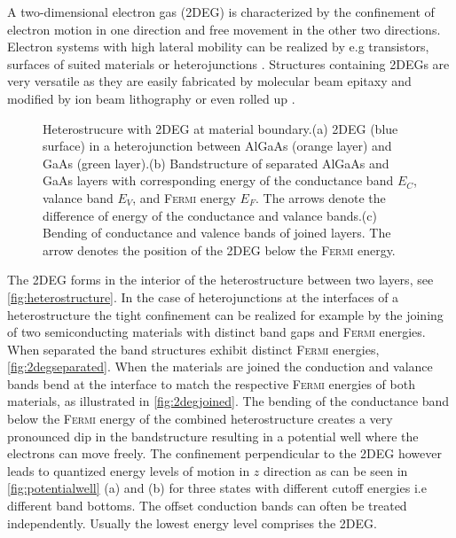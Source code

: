 A two-dimensional electron gas (2DEG) is characterized by the confinement of electron motion in one direction and free movement in the other two directions. 
Electron systems with high lateral mobility can be realized by e.g transistors, surfaces of suited materials \cite{PhysRevLett.12.271} or heterojunctions \cite{JVSTB.4.853}. Structures containing 2DEGs are very versatile as they are easily fabricated by molecular beam epitaxy and modified by ion beam lithography \cite{Ingram1995}\cite{Nowack2009Thesis} or even rolled up \cite{Vorob'ev2004171}. 
\begin{figure}[!h]
\centering
{} \quad\quad
{} \quad\quad
{}
\caption{Heterostrucure with 2DEG at material boundary.(a) 2DEG (blue surface) in a heterojunction between AlGaAs (orange layer) and GaAs (green layer).(b) Bandstructure of separated AlGaAs and GaAs layers with corresponding energy of the conductance band $E_C$, valance band $E_V$, and \textsc{Fermi} energy $E_F$. The arrows denote the difference of energy of the conductance and valance bands.(c) Bending of conductance and valence bands of joined layers. The arrow denotes the position of the 2DEG below the \textsc{Fermi} energy.}
\label{fig:hetero2deg}
\end{figure}
The 2DEG forms in the interior of the heterostructure between two layers, see \cref{fig:heterostructure}. In the case of heterojunctions at the interfaces of a heterostructure the tight confinement can be realized for example by the joining of two semiconducting materials with distinct band gaps and \textsc{Fermi} energies. When separated the band structures exhibit distinct \textsc{Fermi} energies, \cref{fig:2degseparated}. When the materials are joined the conduction and valance bands bend at the interface to match the respective \textsc{Fermi} energies of both materials, as illustrated in \cref{fig:2degjoined}.
The bending of the conductance band below the \textsc{Fermi} energy of the combined heterostructure creates a very pronounced dip in the bandstructure resulting in a potential well where the electrons can move freely. The confinement perpendicular to the 2DEG however leads to quantized energy levels of motion in $z$ direction as can be seen in \cref{fig:potentialwell} (a) and (b) for three states with different cutoff energies i.e different band bottoms. The offset conduction bands can often be treated independently. Usually the lowest energy level comprises the 2DEG\cite{Datta1997}.
